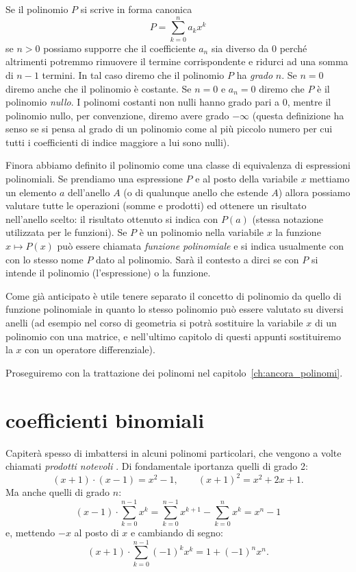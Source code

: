 Se il polinomio $P$ si scrive in forma canonica
\[
  P = \sum_{k=0}^n a_k x^k
\]
se $n>0$ possiamo supporre che il coefficiente $a_n$ sia diverso da $0$ 
perché altrimenti potremmo rimuovere il termine corrispondente e ridurci 
ad una somma di $n-1$ termini. 
In tal caso diremo che il polinomio $P$ ha \emph{grado}%
%
 $n$.
%
% 
Se $n=0$ diremo anche che il polinomio è costante.
Se $n=0$ e $a_n=0$ diremo che $P$ è il polinomio \emph{nullo}.
I polinomi costanti non nulli hanno grado pari a $0$, mentre il polinomio nullo, 
per convenzione, diremo avere grado $-\infty$ (questa definizione ha senso se si pensa 
al grado di un polinomio come al più piccolo numero per cui tutti i coefficienti di
indice maggiore a lui sono nulli).

Finora abbiamo definito il polinomio come una classe di equivalenza di 
espressioni polinomiali. 
Se prendiamo una espressione $P$ e al posto della variabile $x$ 
mettiamo un elemento $a$ dell'anello $A$ (o di qualunque anello che estende 
$A$) allora possiamo valutare tutte le operazioni (somme e prodotti) ed 
ottenere un risultato nell'anello scelto: il risultato 
ottenuto si indica con $P(a)$ (stessa notazione utilizzata per le funzioni).
Se $P$ è un polinomio nella variabile $x$ la funzione $x\mapsto P(x)$ 
può essere chiamata \emph{funzione polinomiale}%
%
 e si indica usualmente 
con con lo stesso nome $P$ dato al polinomio. Sarà il contesto a dirci 
se con $P$ si intende il polinomio (l'espressione) o la funzione.

Come già anticipato è utile tenere separato il concetto di polinomio da quello di 
funzione polinomiale in quanto lo stesso polinomio può essere valutato su diversi 
anelli (ad esempio nel corso di geometria si potrà sostituire
la variabile $x$ di un polinomio con una matrice, 
e nell'ultimo capitolo di questi appunti 
sostituiremo la $x$ con un operatore differenziale).

Proseguiremo con la trattazione dei polinomi 
nel capitolo~\ref{ch:ancora_polinomi}.

\section{coefficienti binomiali}
\label{ch:binomiale}

Capiterà spesso di imbattersi in alcuni polinomi particolari, che vengono 
a volte chiamati \emph{prodotti notevoli}%
%
. 
Di fondamentale iportanza quelli di grado 2:
\[
  (x+1)\cdot(x-1) = x^2-1, \qquad (x+1)^2 = x^2+2x + 1.
\]
Ma anche quelli di grado $n$:
\[
  (x-1)\cdot \sum_{k=0}^{n-1} x^k
  = \sum_{k=0}^{n-1} x^{k+1} - \sum_{k=0}^n x^k = x^n - 1
\]
e, mettendo $-x$ al posto di $x$ e cambiando di segno:
\[
  (x+1)\cdot \sum_{k=0}^{n-1} (-1)^k x^k
  = 1 + (-1)^n x^n.
\]

